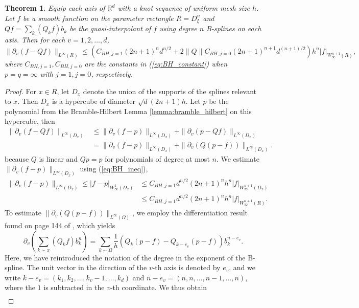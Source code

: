 \documentclass[10pt]{article}
\newtheorem{theorem}{Theorem}[section]
\theoremstyle{definition}
\numberwithin{equation}{section}
\numberwithin{figure}{section}
\numberwithin{table}{section}
\begin{document}
\begin{theorem}
Equip each axis of $\mathbb{R}^d$ with a knot sequence of uniform mesh size $h$. Let $f$ be a smooth function on the parameter rectangle $R=D_\xi^n$ and $Qf=\sum_k(Q_kf)b_k$ be the quasi-interpolant of $f$ using degree $n$ B-splines on each axis. Then for each $v=1,2,\dots,d$,
$$\|\partial_v(f-Qf)\|_{L^\infty(R)}\leq (C_{BH,j=1}(2n+1)^nd^{n/2}+2\|Q\|C_{BH,j=0}(2n+1)^{n+1}d^{(n+1)/2})h^n|f|_{W^{n+1}_\infty(R)},$$
where $C_{BH,j=1},C_{BH,j=0}$ are the constants in (\ref{eq:BH_constant}) when $p=q=\infty$ with $j=1,j=0$, respectively.
\label{thm:partial_est}
\end{theorem}
\begin{proof}
For $x\in R$, let $D_x$ denote the union of the supports of the splines relevant to $x$. Then $D_x$ is a hypercube of diameter $\sqrt{d}(2n+1)h$. Let $p$ be the polynomial from the Bramble-Hilbert Lemma \ref{lemma:bramble_hilbert} on this hypercube, then 
\begin{align*}
\|\partial_v(f-Qf)\|_{L^\infty(D_x)}&\leq \|\partial_v(f-p)\|_{L^\infty(D_x)}+\|\partial_v(p-Qf)\|_{L^\infty(D_x)}\\
&=\|\partial_v(f-p)\|_{L^\infty(D_x)}+\|\partial_v(Q(p-f))\|_{L^\infty(D_x)}.
\end{align*}
because $Q$ is linear and $Qp=p$ for polynomials of degree at most $n$. We estimate $\|\partial_v(f-p)\|_{L^\infty(D_x)}$ using (\ref{eq:BH_ineq}),
\begin{align*}
\|\partial_v(f-p)\|_{L^\infty(D_x)}\leq |f-p|_{W^1_\infty(D_x)}&\leq C_{BH,j=1}d^{n/2}(2n+1)^{n}h^n|f|_{W^{n+1}_\infty(D_x)}\\
&\leq C_{BH,j=1}d^{n/2}(2n+1)^nh^n|f|_{W^{n+1}_\infty(R)}.
\end{align*}
To estimate $\|\partial_v(Q(p-f))\|_{L^\infty(\Omega)}$, we employ the differentiation result found on page 144 of \cite{hollig2013approximation}, which yields
$$\partial_v\left(\sum_{k\sim x}(Q_kf)b^n_k\right)=\sum_{k\sim \Omega}\frac{1}{h}(Q_k(p-f)-Q_{k-e_v}(p-f))b_k^{n-e_v}.$$
Here, we have reintroduced the notation of the degree in the exponent of the B-spline. The unit vector in the direction of the $v$-th axis is denoted by $e_v$, and we write $k-e_v=(k_1,k_2,\dots,k_v-1,\dots,k_d)$ and $n-e_v=(n,n,\dots,n-1,\dots,n)$, where the $1$ is subtracted in the $v$-th coordinate. We thus obtain
\begin{align*}

\end{align*}
\end{proof}
\end{document}
